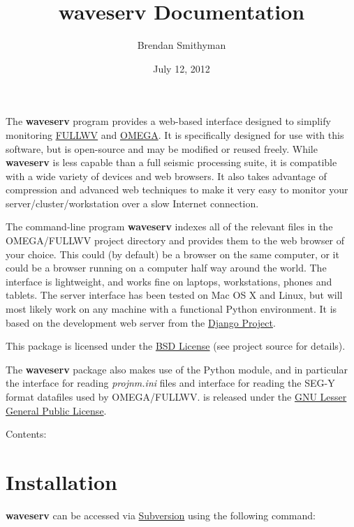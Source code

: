 \documentclass[letterpaper,10pt,english]{sphinxmanual}
\title{waveserv Documentation}
\date{July 12, 2012}
\author{Brendan Smithyman}
\begin{document}
\maketitle
\tableofcontents
{}\label{index::doc}


The \textbf{waveserv} program provides a web-based interface designed to simplify monitoring \href{http://orion.es.uwo.ca/index.php/FULLWV}{FULLWV} and \href{http://orion.es.uwo.ca/index.php/OMEGA}{OMEGA}.  It is specifically designed for use with this software, but is open-source and may be modified or reused freely.  While \textbf{waveserv} is less capable than a full seismic processing suite, it is compatible with a wide variety of devices and web browsers.  It also takes advantage of compression and advanced web techniques to make it very easy to monitor your server/cluster/workstation over a slow Internet connection.

The command-line program \textbf{waveserv} indexes all of the relevant files in the OMEGA/FULLWV project directory and provides them to the web browser of your choice.  This could (by default) be a browser on the same computer, or it could be a browser running on a computer half way around the world.  The interface is lightweight, and works fine on laptops, workstations, phones and tablets.  The server interface has been tested on Mac OS X and Linux, but will most likely work on any machine with a functional Python environment.  It is based on the development web server from the \href{http://www.djangoproject.com/}{Django Project}.

This package is licensed under the \href{http://www.opensource.org/licenses/BSD-3-Clause}{BSD License} (see project source for details).

The \textbf{waveserv} package also makes use of the  Python module, and in particular the  interface for reading \emph{projnm.ini} files and  interface for reading the SEG-Y format datafiles used by OMEGA/FULLWV.   is released under the \href{http://www.opensource.org/licenses/lgpl-3.0.html}{GNU Lesser General Public License}.

Contents:


\chapter{Installation}
\label{installation:introduction}\label{installation:installation}\label{installation:intro}\label{installation::doc}\label{installation:id1}
\textbf{waveserv} can be accessed via \href{http://subversion.apache.org/}{Subversion} using the following command:
\end{document}
